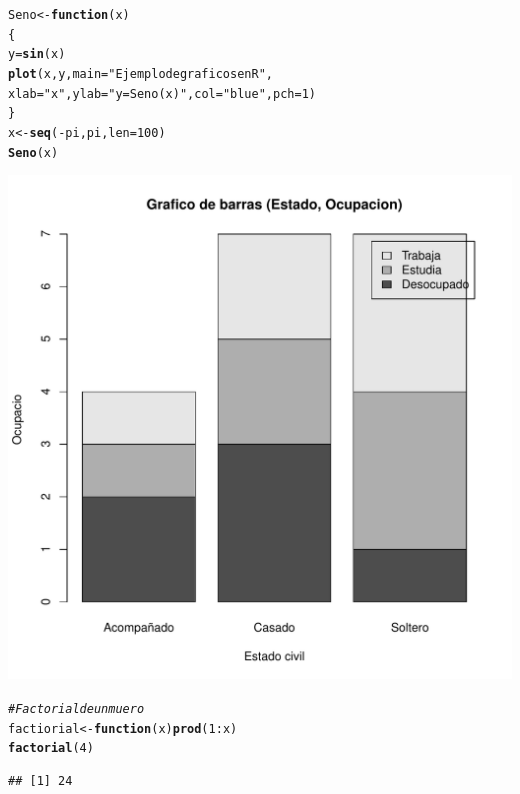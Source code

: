 \documentclass{article}\usepackage[]{graphicx}\usepackage[]{color}
\makeatletter
\def\maxwidth{ %
  \ifdim\Gin@nat@width>\linewidth
    \linewidth
  \else
    \Gin@nat@width
  \fi
}
\newcommand{\hlnum}[1]{\textcolor[rgb]{0.686,0.059,0.569}{#1}}%
\newcommand{\hlstr}[1]{\textcolor[rgb]{0.192,0.494,0.8}{#1}}%
\newcommand{\hlcom}[1]{\textcolor[rgb]{0.678,0.584,0.686}{\textit{#1}}}%
\newcommand{\hlopt}[1]{\textcolor[rgb]{0,0,0}{#1}}%
\newcommand{\hlstd}[1]{\textcolor[rgb]{0.345,0.345,0.345}{#1}}%
\newcommand{\hlkwa}[1]{\textcolor[rgb]{0.161,0.373,0.58}{\textbf{#1}}}%
\newcommand{\hlkwb}[1]{\textcolor[rgb]{0.69,0.353,0.396}{#1}}%
\newcommand{\hlkwc}[1]{\textcolor[rgb]{0.333,0.667,0.333}{#1}}%
\newcommand{\hlkwd}[1]{\textcolor[rgb]{0.737,0.353,0.396}{\textbf{#1}}}%
\newenvironment{kframe}{%
 \def\at@end@of@kframe{}%
 \ifinner\ifhmode%
  \def\at@end@of@kframe{\end{minipage}}%
  \begin{minipage}{\columnwidth}%
 \fi\fi%
 \def\FrameCommand##1{\hskip\@totalleftmargin \hskip-\fboxsep
 \colorbox{shadecolor}{##1}\hskip-\fboxsep
     \hskip-\linewidth \hskip-\@totalleftmargin \hskip\columnwidth}%
 \MakeFramed {\advance\hsize-\width
   \@totalleftmargin\z@ \linewidth\hsize
   \@setminipage}}%
 {\par\unskip\endMakeFramed%
 \at@end@of@kframe}
\newenvironment{knitrout}{}{} %
\makeatother
\begin{document}
\begin{knitrout}
\begin{kframe}
\begin{alltt}
\hlstd{Seno} \hlkwb{<-} \hlkwa{function}\hlstd{(}\hlkwc{x}\hlstd{)}
    \hlstd{\{}
    \hlstd{y} \hlkwb{=} \hlkwd{sin}\hlstd{(x)}
    \hlkwd{plot}\hlstd{(x, y,} \hlkwc{main}\hlstd{=}\hlstr{"Ejemplo de graficos en R"}\hlstd{,}
         \hlkwc{xlab}\hlstd{=}\hlstr{"x"}\hlstd{,} \hlkwc{ylab}\hlstd{=}\hlstr{"y = Seno(x)"}\hlstd{,} \hlkwc{col}\hlstd{=}\hlstr{"blue"}\hlstd{,} \hlkwc{pch}\hlstd{=}\hlnum{1}\hlstd{)}
\hlstd{\}}
\hlstd{x}\hlkwb{<-}\hlkwd{seq}\hlstd{(}\hlopt{-}\hlstd{pi, pi,} \hlkwc{len}\hlstd{=}\hlnum{100}\hlstd{)}
\hlkwd{Seno}\hlstd{(x)}
\end{alltt}
\end{kframe}
\includegraphics[width=\maxwidth]{figure/unnamed-chunk-1-1} 
\begin{kframe}\begin{alltt}
\hlcom{#Factorial de un muero}
\hlstd{factiorial} \hlkwb{<-} \hlkwa{function}\hlstd{(}\hlkwc{x}\hlstd{)} \hlkwd{prod}\hlstd{(}\hlnum{1}\hlopt{:}\hlstd{x)}
\hlkwd{factorial}\hlstd{(}\hlnum{4}\hlstd{)}
\end{alltt}
\begin{verbatim}
## [1] 24
\end{verbatim}
\end{kframe}
\end{knitrout}
\end{document}
